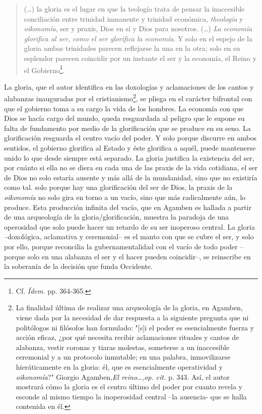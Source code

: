 \begin{quote}
(\dots) la gloria es el lugar en que la teología trata de pensar la
inaccesible conciliación entre trinidad inmanente y trinidad económica,
\emph{theología} y \emph{oikonomía}, ser y praxis, Dios en sí y Dios
para nosotros. (\dots) \emph{La economía glorifica al ser, como el
ser glorifica la economía}. Y solo en el espejo de la gloria ambas
trinidades parecen reflejarse la una en la otra; solo en su esplendor
parecen coincidir por un instante el ser y la economía, el Reino y el
Gobierno\footnote{Cf. \emph{Ídem.} pp. 364-365.}.
\end{quote}

La gloria, que el autor identifica en las doxologías y aclamaciones de
los cantos y alabanzas inauguradas por el cristianismo\footnote{La
  finalidad última de realizar una arqueología de la gloria, en Agamben,
  viene dada por la necesidad de dar respuesta a la siguiente pregunta
  que ni politólogos ni filósofos han formulado: "{[}s{]}i el poder es
  esencialmente fuerza y acción eficaz, ¿por qué necesita recibir
  aclamaciones rituales y cantos de alabanza, vestir coronas y tiaras
  molestas, someterse a un inaccesible ceremonial y a un protocolo
  inmutable; en una palabra, inmovilizarse hieráticamente en la gloria:
  él, que es esencialmente operatividad y \emph{oikonomía}?" Giorgio
  Agamben,\emph{El reino\ldots,op. cit.} p. 343. Así, el autor mostrará
  cómo la gloria es el centro último del poder por cuanto revela y
  esconde al mismo tiempo la inoperosidad central --la ausencia- que se
  halla contenida en él.}, se pliega en el carácter bifrontal con que el
gobierno toma a su cargo la vida de los hombres. La economía con que
Dios se hacía cargo del mundo, queda resguardada al peligro que le
supone su falta de fundamento por medio de la glorificación que se
produce en su seno. La glorificación resguarda el centro vacío del
poder. Y solo porque discurre en ambos sentidos, el gobierno glorifica
al Estado y éste glorifica a aquél, puede mantenerse unido lo que desde
siempre está separado. La gloria justifica la existencia del ser, por
cuánto si ella no se diera en cada una de las praxis de la vida
cotidiana, el ser de Dios no solo estaría ausente y más allá de la
mundanidad, sino que no existiría como tal. solo porque hay una
glorificación del ser de Dios, la praxis de la \emph{oikonomía} no solo
gira en torno a un vacío, sino que más radicalmente aún, lo produce.
Esta producción infinita del vacío, que en Agamben es hallada a partir
de una arqueología de la gloria/glorificación, muestra la paradoja de
una operosidad que solo puede hacer un retardo de su ser inoperoso
central. La gloria --doxológica, aclamativa y ceremonial-- es el manto
con que se cubre el ser, y solo por ello, porque reconcilia la
gubernamentalidad con el vacío de todo poder --porque solo en una
alabanza el ser y el hacer pueden coincidir--, se reinscribe en la
soberanía de la decisión que funda Occidente.

